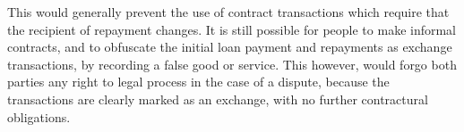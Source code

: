 This would generally prevent the use of contract transactions which require that the recipient of
repayment changes. It is still possible for people to make informal contracts, and to obfuscate the
initial loan payment and repayments as exchange transactions, by recording a false good or service.
This however, would forgo both parties any right to legal process in the case of a dispute, because
the transactions are clearly marked as an exchange, with no further contractural obligations.












